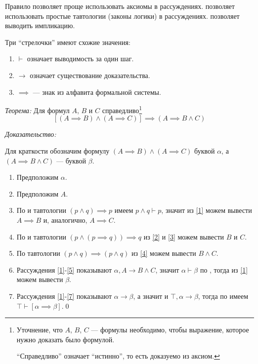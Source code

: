 Правило \axiom{} позволяет проще использовать аксиомы в рассуждениях.
\taut{} позволяет использовать простые тавтологии (законы логики) в рассуждениях.
\implic{} позволяет выводить импликацию.

Три ``стрелочки'' имеют схожие значения:
\begin{enumerate}
	\item{}$\vdash$ означает выводимость за один шаг.
	\item{}$\to$ означает существование доказательства.
	\item{}$\implies$ --- знак из алфавита формальной системы.
\end{enumerate}

{\it Теорема:} Для формул $A$, $B$ и $C$ справедливо\footnote[][3mm]{
	Уточнение, что $A$, $B$, $C$ --- формулы необходимо, чтобы выражение, которое
	нужно доказать было формулой.

	``Справедливо'' означает ``истинно'', то есть доказуемо из аксиом.
}
\[
	[(A\implies B)\land (A\implies C)]\implies (A\implies B\land C)
\]

{\it Доказательство:}

Для краткости обозначим формулу
${(A\implies B)\land (A\implies C)}$ буквой $\alpha$,
а $(A\implies B\land C)$ --- буквой $\beta$.

\begin{enumerate}[label=(\arabic*)]
	\item{}\label{1}Предположим $\alpha$.

	\item{}\label{2}Предположим $A$.

	\item{}\label{3}По \taut{} и тавтологии $(p\land q)\implies p$ имеем
	$p\land q\vdash p$, значит из \ref{1} можем вывести
	$A\implies B$ и, аналогично, $A\implies C$.

	\item{}\label{4}По \taut{} и тавтологии ${(p\land (p\implies q))\implies q}$
	из \ref{2} и \ref{3} можем вывести $B$ и $C$.

	\item{}\label{5}По тавтологии $(p\land q)\implies(p\land q)$
	из \ref{4} можем вывести $B\land C$.

	\item{}\label{6}Рассуждения \ref{1}-\ref{5} показывают
	$\alpha,A\to B\land C$, значит $\alpha\vdash \beta$ по \implic{},
	тогда из \ref{1} можем вывести $\beta$.

	\item{}\label{7}
	Рассуждения \ref{1}-\ref{7} показывают $\alpha\to\beta$,
	а значит и $\top,\alpha\to\beta$, тогда по \implic{}
	имеем $\top\vdash [\alpha\implies\beta]$.\qed
\end{enumerate}

